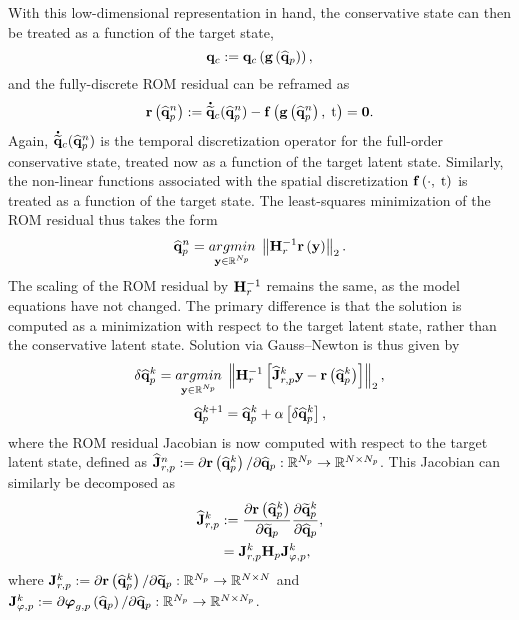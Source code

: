 With this low-dimensional representation in hand, the conservative state can then be treated as a function of the target state,
%
\begin{equation}\label{eq:consFuncTarget}
    \mathbf{q}_{c} := \mathbf{q}_{c} \left(\mathbf{g} \left(\mathbf{\widehat{q}}_{p}\right)\right),
\end{equation}
%
and the fully-discrete ROM residual can be reframed as
%
\begin{equation}
    \mathbf{r}\left(\mathbf{\widehat{q}}_{p}^{n}\right) := \accentset{\mbox{\large\bfseries .}}{\mathbf{\widetilde{q}}}_{c}(\mathbf{\widehat{q}}_{p}^{n}) - \mathbf{f} \left(\mathbf{g} \left(\mathbf{\widehat{q}}_{p}^{n}\right), \; \text{t}\right) = \mathbf{0}.
\end{equation}
%
Again, $\accentset{\mbox{\large\bfseries .}}{\mathbf{\widetilde{q}}}_{c}(\mathbf{\widehat{q}}_{p}^{n})$ is the temporal discretization operator for the full-order conservative state, treated now as a function of the target latent state. Similarly, the non-linear functions associated with the spatial discretization $ \mathbf{f} \left(\cdot, \; \text{t}\right)$ is treated as a function of the target state. The least-squares minimization of the ROM residual thus takes the form
%
\begin{equation}\label{eq:mplsvtLS}
    \primVecCoef^{\timeIdx} = \argmin{\dummyVec \inROne{\numPrimModes}} \left\Vert \resScaleInv \resFunc{\dummyVec} \right\Vert_2.
\end{equation}
%
The scaling of the ROM residual by $\resScaleInv$ remains the same, as the model equations have not changed. The primary difference is that the solution is computed as a minimization with respect to the target latent state, rather than the conservative latent state. Solution via Gauss--Newton is thus given by
%
\begin{equation}\label{eq:mplsvtLSLin}
    \delta \primVecCoef^{\newtonIdx} = \argmin{\dummyVec \inROne{\numPrimModes}} \left\Vert \resScaleInv \left[\jacobResCoefPrim^{\newtonIdx} \dummyVec - \resFunc{\primVecCoef^{\newtonIdx}}\right] \right\Vert_2,
\end{equation}
\begin{equation}
    \mathbf{\widehat{q}}_{p}^{k + 1} = \mathbf{\widehat{q}}_{p}^{k} + \alpha \left[ \delta \mathbf{\widehat{q}}_{p}^{k} \right],
\end{equation}
%
where the ROM residual Jacobian is now computed with respect to the target latent state, defined as $\mathbf{\widehat{J}}_{r,p}^{n} := \partial \mathbf{r}\left(\mathbf{\widehat{q}}_{p}^{k}\right) / \partial \mathbf{\widehat{q}}_{p}: \mathbb{R}^{N_p} \rightarrow \mathbb{R}^{N \times N_p}$. This Jacobian can similarly be decomposed as
%
\begin{align}
    \jacobResCoefPrim^{\newtonIdx} &\defEq \pde{\resFunc{\primVecCoef^{\newtonIdx}}}{\primVecRom} \pde{\primVecRom^{\newtonIdx}}{\primVecCoef}, \\
    &= \jacobResPrim^{\newtonIdx} \primScale \jacobTrialPrim^{\newtonIdx},
\end{align}
%
where $\mathbf{J}_{r,p}^{k} := \partial \mathbf{r}\left(\mathbf{\widehat{q}}_{p}^{k}\right) / \partial \mathbf{\widetilde{q}}_{p}: \mathbb{R}^{N_p} \rightarrow \mathbb{R}^{N \times N}$ and $\mathbf{J}_{\varphi,p}^{k} := \partial \boldsymbol{\varphi}_{g, p} \left(\mathbf{\widehat{q}}_{p}\right) / \partial \mathbf{\widehat{q}}_{p}: \mathbb{R}^{N_p} \rightarrow \mathbb{R}^{N \times N_p}$.

